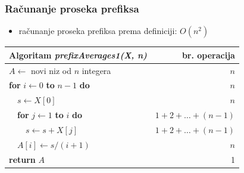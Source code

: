 \documentclass[compress,aspectratio=169]{beamer}
\begin{document}
\begin{frame}[fragile]
  \frametitle{Računanje proseka prefiksa}
  \begin{itemize}
    \item računanje proseka prefiksa prema definiciji: $O(n^2)$
  \end{itemize}
  \begin{center}
    \begin{tabular}{l|r}
      \textbf{Algoritam} \textit{prefixAverages1(X, n)} & \textbf{br. operacija} \\ \hline
      $A \leftarrow$ novi niz od $n$ integera & $n$ \\
      \textbf{for} $i \leftarrow 0$ \textbf{to} $n - 1$ \textbf{do} & $n$ \\
      \ \ $s \leftarrow X[0]$ & $n$ \\
      \ \ \textbf{for} $j \leftarrow 1$ \textbf{to} $i$ \textbf{do} & $1+2+\ldots+(n-1)$ \\
      \ \ \ \ $s \leftarrow s + X[j]$ & $1+2+\ldots+(n-1)$ \\
      \ \ $A[i] \leftarrow s/(i+1)$ & $n$ \\
      \textbf{return} $A$ & 1
    \end{tabular}
  \end{center}
\end{frame}
\end{document}
